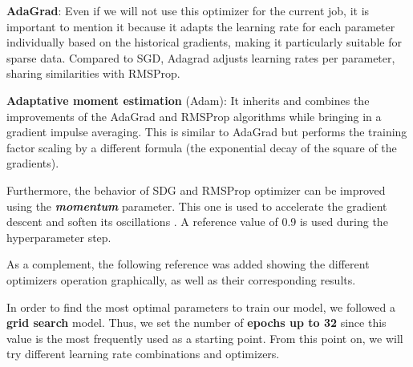 \begin{enumerate}
    \textbf{AdaGrad}: Even if we will not use this optimizer for the current job, it is important to mention it because it adapts the learning rate for each parameter individually based on the historical gradients, making it particularly suitable for sparse data. Compared to SGD, Adagrad adjusts learning rates per parameter, sharing similarities with RMSProp. 
    
    \textbf{Adaptative moment estimation} (Adam): It inherits and combines the improvements of the AdaGrad and RMSProp algorithms while bringing in a gradient impulse averaging. This is similar to AdaGrad but performs the training factor scaling by a different formula (the exponential decay of the square of the gradients).

    Furthermore, the behavior of SDG and RMSProp optimizer can be improved using the \textit{\textbf{momentum}} parameter. This one is used to accelerate the gradient descent and soften its oscillations \cite{SGDwithMomentum}. A reference value of 0.9 is used during the hyperparameter step.

    As a complement, the following reference was added \cite{optimizers1} showing the different optimizers operation graphically, as well as their corresponding results. 

    In order to find the most optimal parameters to train our model, we followed a \textbf{grid search} model. Thus, we set the number of \textbf{epochs up to 32} since this value is the most frequently used as a starting point. From this point on, we will try different learning rate combinations and optimizers.

\end{enumerate}

